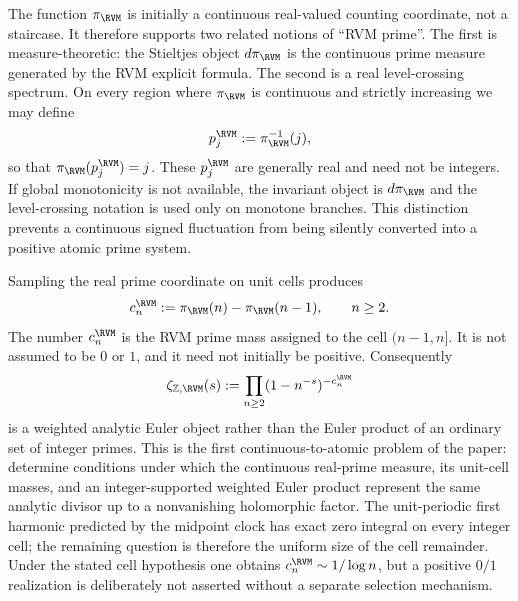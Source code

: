 The function $\pi_{\RVM}$ is initially a continuous real-valued counting
coordinate, not a staircase.  It therefore supports two related notions of
``RVM prime''.  The first is measure-theoretic: the Stieltjes object
$d\pi_{\RVM}$ is the continuous prime measure generated by the RVM explicit
formula.  The second is a real level-crossing spectrum.  On every region where
$\pi_{\RVM}$ is continuous and strictly increasing we may define
\begin{equation}
 p_j^{\RVM}:=\pi_{\RVM}^{-1}(j),
 \label{eq:intro-real-primes}
\end{equation}
so that $\pi_{\RVM}(p_j^{\RVM})=j$.  These $p_j^{\RVM}$ are generally real and
need not be integers.  If global monotonicity is not available, the invariant
object is $d\pi_{\RVM}$ and the level-crossing notation is used only on
monotone branches.  This distinction prevents a continuous signed fluctuation
from being silently converted into a positive atomic prime system.

Sampling the real prime coordinate on unit cells produces
\begin{equation}
 c_n^{\RVM}
 :=\pi_{\RVM}(n)-\pi_{\RVM}(n-1),
 \qquad n\ge2.
 \label{eq:intro-cellweights}
\end{equation}
The number $c_n^{\RVM}$ is the RVM prime mass assigned to the cell $(n-1,n]$.
It is not assumed to be $0$ or $1$, and it need not initially be positive.
Consequently
\begin{equation}
 \zeta_{\mathbb Z,\RVM}(s)
 :=\prod_{n\ge2}(1-n^{-s})^{-c_n^{\RVM}}
 \label{eq:intro-weighted-euler}
\end{equation}
is a weighted analytic Euler object rather than the Euler product of an
ordinary set of integer primes.  This is the first continuous-to-atomic problem
of the paper: determine conditions under which the continuous real-prime
measure, its unit-cell masses, and an integer-supported weighted Euler product
represent the same analytic divisor up to a nonvanishing holomorphic factor.
The unit-periodic first harmonic predicted by the midpoint clock has exact
zero integral on every integer cell; the remaining question is therefore the
uniform size of the cell remainder.  Under the stated cell hypothesis one
obtains $c_n^{\RVM}\sim1/\log n$, but a positive $0/1$ realization is deliberately
not asserted without a separate selection mechanism.

